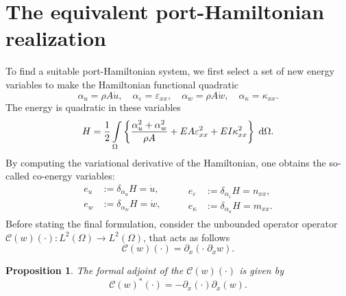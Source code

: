 \documentclass{ifacconf}
\newtheorem{proposition}{Proposition}
\begin{document}
\section{The equivalent port-Hamiltonian realization}\label{sec:pHmodel}
To find a suitable port-Hamiltonian system, we first select a set of new energy variables to make the Hamiltonian functional quadratic
\begin{equation}\label{eq:energies}
	\alpha_u = \rho A \dot{u}, \quad \alpha_\varepsilon = \varepsilon_{xx}, \quad \alpha_w = \rho A \dot{w}, \quad \alpha_\kappa = \kappa_{xx}.
\end{equation}
The energy is quadratic in these variables
\begin{equation}
	H = \frac{1}{2} \int_{\Omega} \left\{\frac{\alpha_u^2 + \alpha_w^2}{\rho A} + EA \varepsilon_{xx}^2 + EI \kappa_{xx}^2 \right\} \d{\Omega}.
\end{equation}
By computing the variational derivative of the Hamiltonian, one obtains the so-called co-energy variables:
\begin{equation}\label{eq:coenergies}
	\begin{aligned}
	e_u &:= \delta_{\alpha_u} H = \dot{u}, \\
	e_w &:= \delta_{\alpha_w} H = \dot{w}, \\
	\end{aligned} \qquad 
\begin{aligned}
	e_\varepsilon &:= \delta_{\alpha_\varepsilon} H = n_{xx}, \\ e_\kappa &:= \delta_{\alpha_\kappa} H = m_{xx}.
\end{aligned}
\end{equation}
Before stating the final formulation, consider the unbounded operator operator $\mathcal{C}(w)(\cdot): L^2(\Omega) \rightarrow L^2(\Omega)$, that acts as follows
\begin{equation}
	\mathcal{C}(w)(\cdot ) = \partial_x(\cdot \; \partial_x w).
\end{equation}
\begin{proposition}\label{prop:adjC}
	The formal adjoint of the $\mathcal{C}(w)(\cdot)$ is given by
	\begin{equation}
		\mathcal{C}(w)^*(\cdot) = -\partial_x (\cdot) \partial_x(w).
	\end{equation}
\end{proposition}
\end{document}
